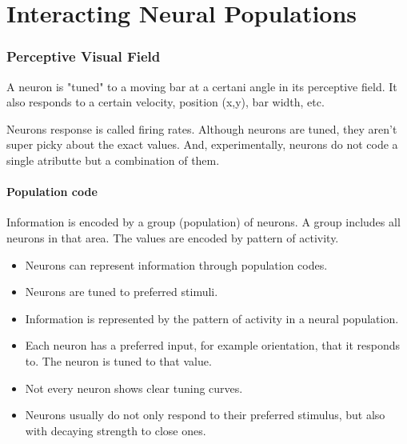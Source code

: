 \documentclass[main]{subfiles}
\begin{document}

\section{Interacting Neural Populations}

\subsubsection{Perceptive Visual Field}

A neuron is "tuned" to a moving bar at a certani angle in its perceptive field. It also responds to a certain velocity, position (x,y), bar width, etc.

Neurons response is called firing rates. Although neurons are tuned, they aren't super picky about the exact values. And, experimentally, neurons do not code a single atributte but a combination of them.

\paragraph{Population code}

Information is encoded by a group (population) of neurons. A group includes all neurons in that area. The values are encoded by pattern of activity.

\begin{itemize}[noitemsep,nolistsep]
	\item Neurons can represent information through population codes.
	\item Neurons are tuned to preferred stimuli.
	\item Information is represented by the pattern of activity in a neural population.
	\item Each neuron has a preferred input, for example orientation, that it responds to. The neuron is tuned to that value.
	\item Not every neuron shows clear tuning curves.
	\item Neurons usually do not only respond to their preferred stimulus, but also with decaying strength to close ones.
\end{itemize}
\end{document}
